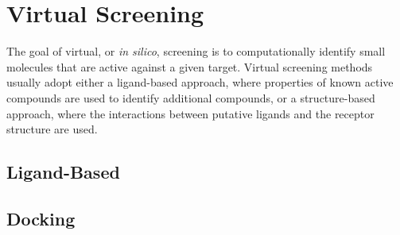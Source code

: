\section{Virtual Screening}

The goal of virtual, or \textit{in silico}, screening is to computationally identify small molecules that are active against a given target.  Virtual screening methods usually adopt either a ligand-based approach, where properties of known active compounds are used to identify additional compounds, or a structure-based approach, where the interactions between putative ligands and the receptor structure are used.

\subsection{Ligand-Based}

\subsection{Docking}
  